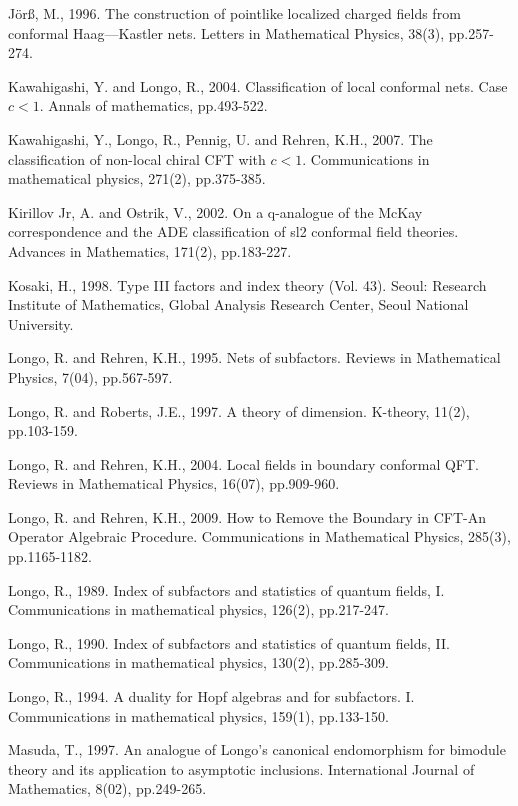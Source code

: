 \documentclass[12pt,a4paper,notitlepage]{article}
\theoremstyle{definition}
\theoremstyle{plain}
\numberwithin{equation}{section}
\begin{document}
\begin{thebibliography}{999999}
J\"or\ss, M., 1996. The construction of pointlike localized charged fields from conformal Haag—Kastler nets. Letters in Mathematical Physics, 38(3), pp.257-274.

Kawahigashi, Y. and Longo, R., 2004. Classification of local conformal nets. Case $c<1$. Annals of mathematics, pp.493-522.

Kawahigashi, Y., Longo, R., Pennig, U. and Rehren, K.H., 2007. The classification of non-local chiral CFT with $c<1$. Communications in mathematical physics, 271(2), pp.375-385.

Kirillov Jr, A. and Ostrik, V., 2002. On a q-analogue of the McKay correspondence and the ADE classification of sl2 conformal field theories. Advances in Mathematics, 171(2), pp.183-227.

Kosaki, H., 1998. Type III factors and index theory (Vol. 43). Seoul: Research Institute of Mathematics, Global Analysis Research Center, Seoul National University.

Longo, R. and Rehren, K.H., 1995. Nets of subfactors. Reviews in Mathematical Physics, 7(04), pp.567-597.

Longo, R. and Roberts, J.E., 1997. A theory of dimension. K-theory, 11(2), pp.103-159.

Longo, R. and Rehren, K.H., 2004. Local fields in boundary conformal QFT. Reviews in Mathematical Physics, 16(07), pp.909-960.

Longo, R. and Rehren, K.H., 2009. How to Remove the Boundary in CFT-An Operator Algebraic Procedure. Communications in Mathematical Physics, 285(3), pp.1165-1182.

Longo, R., 1989. Index of subfactors and statistics of quantum fields, I. Communications in mathematical physics, 126(2), pp.217-247.

Longo, R., 1990. Index of subfactors and statistics of quantum fields, II. Communications in mathematical physics, 130(2), pp.285-309.

Longo, R., 1994. A duality for Hopf algebras and for subfactors. I. Communications in mathematical physics, 159(1), pp.133-150.

Masuda, T., 1997. An analogue of Longo's canonical endomorphism for bimodule theory and its application to asymptotic inclusions. International Journal of Mathematics, 8(02), pp.249-265.


\end{thebibliography}
\end{document}

